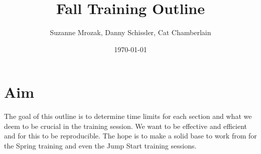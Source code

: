 \documentclass{article}\usepackage[]{graphicx}\usepackage[]{color}
\begin{document}
\renewcommand{\thetable}{\arabic{table}}
\renewcommand{\thefigure}{\arabic{figure}}
\renewcommand{\labelitemi}{$-$}
\title{Fall Training Outline}
\author{Suzanne Mrozak, Danny Schissler, Cat Chamberlain}
\date{\today}
\maketitle
\section*{Aim}
The goal of this outline is to determine time limits for each section and what we deem to be crucial in the training session. We want to be effective and efficient and for this to be reproducible. The hope is to make a solid base to work from for the Spring training and even the Jump Start training sessions. 
\par
\end{document}
